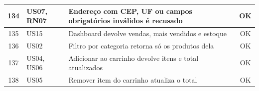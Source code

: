 \begin{longtable}{|c|p{2.5cm}|p{8.4cm}|c|}
134 & US07, RN07 & Endereço com CEP, UF ou campos obrigatórios inválidos é recusado & \cellcolor{green!20}OK \\ \hline
135 & US15 & Dashboard devolve vendas, mais vendidos e estoque & \cellcolor{green!20}OK \\ \hline
136 & US02 & Filtro por categoria retorna só os produtos dela & \cellcolor{green!20}OK \\ \hline
137 & US04, US06 & Adicionar ao carrinho devolve itens e total atualizados & \cellcolor{green!20}OK \\ \hline
138 & US05 & Remover item do carrinho atualiza o total & \cellcolor{green!20}OK \\ \hline
\end{longtable}\normalsize